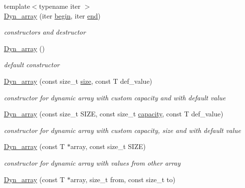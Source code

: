 \begin{DoxyCompactItemize}
\item 
\mbox{\label{classDyn__array_ae1a82cc9f04008331ef114f82ce1943a}} 
{\footnotesize template$<$typename iter $>$ }\\\hyperlink{classDyn__array_ae1a82cc9f04008331ef114f82ce1943a}{Dyn\+\_\+array} (iter \hyperlink{classDyn__array_ad6191fc9efb3505a13de70bc0cc5db3e}{begin}, iter \hyperlink{classDyn__array_af728c3e6b4191f59dfea556dd506ccdc}{end})
\begin{DoxyCompactList}\small\item\em constructors and destructor \end{DoxyCompactList}\item 
\hyperlink{classDyn__array_a3afc99260021fc0a0861c7a6dffa7dcb}{Dyn\+\_\+array} ()
\begin{DoxyCompactList}\small\item\em default constructor \end{DoxyCompactList}\item 
\hyperlink{classDyn__array_a3abedb7c622a7065a133741ca1e20dde}{Dyn\+\_\+array} (const size\+\_\+t \hyperlink{classDyn__array_abe033b7d651c88c537692a4ac9815355}{size}, const T def\+\_\+value)
\begin{DoxyCompactList}\small\item\em constructor for dynamic array with custom capacity and with default value \end{DoxyCompactList}\item 
\hyperlink{classDyn__array_ab65231e8b87c5fbb58f22fb8a1d18ee3}{Dyn\+\_\+array} (const size\+\_\+t S\+I\+ZE, const size\+\_\+t \hyperlink{classDyn__array_a36c5289ec13ee40366fe3b095b2347bf}{capacity}, const T def\+\_\+value)
\begin{DoxyCompactList}\small\item\em constructor for dynamic array with custom capacity, size and with default value \end{DoxyCompactList}\item 
\hyperlink{classDyn__array_a732dc944171bd9abbf0086af367e3202}{Dyn\+\_\+array} (const T $\ast$array, const size\+\_\+t S\+I\+ZE)
\begin{DoxyCompactList}\small\item\em constructor for dynamic array with values from other array \end{DoxyCompactList}\item 
\hyperlink{classDyn__array_a7fa28275bd20add3643eeab60e06a431}{Dyn\+\_\+array} (const T $\ast$array, size\+\_\+t from, const size\+\_\+t to)

\end{DoxyCompactItemize}
